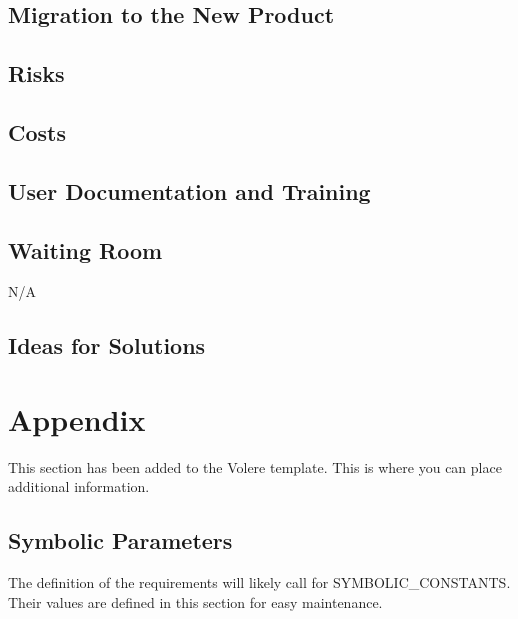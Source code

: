 \documentclass[12pt, titlepage]{article}
\begin{document}
\subsection{Migration to the New Product}

\subsection{Risks}

\subsection{Costs}

\subsection{User Documentation and Training}

\subsection{Waiting Room}

N/A

\subsection{Ideas for Solutions}





\newpage

\section{Appendix}

This section has been added to the Volere template.  This is where you can place
additional information.

\subsection{Symbolic Parameters}

The definition of the requirements will likely call for SYMBOLIC\_CONSTANTS.
Their values are defined in this section for easy maintenance.
\end{document}
